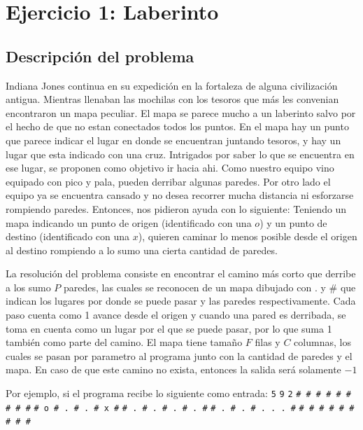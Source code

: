 \section{Ejercicio 1: Laberinto}
    \subsection{Descripción del problema}
		    Indiana Jones continua en su expedición en la fortaleza de alguna civilización antigua. Mientras llenaban las mochilas con los tesoros que más les convenian encontraron un mapa peculiar. El mapa se parece mucho a un laberinto salvo por el hecho de que no estan conectados todos los puntos. En el mapa hay un punto que parece indicar el lugar en donde se encuentran juntando tesoros, y hay un lugar que esta indicado con una cruz. Intrigados por saber lo que se encuentra en ese lugar, se proponen como objetivo ir hacia ahi. Como nuestro equipo vino equipado con pico y pala, pueden derribar algunas paredes. Por otro lado el equipo ya se encuentra cansado y no desea recorrer mucha distancia ni esforzarse rompiendo paredes. Entonces, nos pidieron ayuda con lo siguiente: Teniendo un mapa indicando un punto de origen (identificado con una $o$) y un punto de destino (identificado con una $x$), quieren caminar lo menos posible desde el origen al destino rompiendo a lo sumo una cierta cantidad de paredes.

        La resolución del problema consiste en encontrar el camino más corto que derribe a los sumo $P$ paredes, las cuales se reconocen de un mapa dibujado con $.$ y $\#$ que indican los lugares por donde se puede pasar y las paredes respectivamente. Cada paso cuenta como 1 avance desde el origen y cuando una pared es derribada, se toma en cuenta como un lugar por el que se puede pasar, por lo que suma 1 también como parte del camino. El mapa tiene tamaño $F$ filas y $C$ columnas, los cuales se pasan por parametro al programa junto con la cantidad de paredes y el mapa. En caso de que este camino no exista, entonces la salida será solamente $-1$

        Por ejemplo, si el programa recibe lo siguiente como entrada: \newline
        \texttt{5} \texttt{9} \texttt{2} \newline
        \texttt{\# \# \# \# \# \# \# \# \#} \newline
        \texttt{\# o \# . \# . \# x \#} \newline
        \texttt{\# . \# . \# . \# . \#} \newline
        \texttt{\# . \# . \# . . . \#} \newline
        \texttt{\# \# \# \# \# \# \# \# \#} \newline

